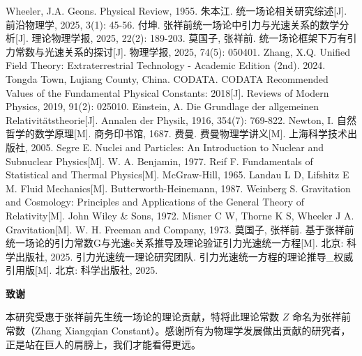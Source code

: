 \documentclass[12pt,a4paper]{article}
\begin{document}
\begin{thebibliography}{99}
 Wheeler, J.A. Geons. Physical Review, 1955.
 朱本江. 统一场论相关研究综述[J]. 前沿物理学, 2025, 3(1): 45-56.
 付坤. 张祥前统一场论中引力与光速关系的数学分析[J]. 理论物理学报, 2025, 22(2): 189-203.
 莫国子, 张祥前. 统一场论框架下万有引力常数与光速关系的探讨[J]. 物理学报, 2025, 74(5): 050401.
 Zhang, X.Q. Unified Field Theory: Extraterrestrial Technology - Academic Edition (2nd). 2024. Tongda Town, Lujiang County, China.
 CODATA. CODATA Recommended Values of the Fundamental Physical Constants: 2018[J]. Reviews of Modern Physics, 2019, 91(2): 025010.
 Einstein, A. Die Grundlage der allgemeinen Relativitätstheorie[J]. Annalen der Physik, 1916, 354(7): 769-822.
 Newton, I. 自然哲学的数学原理[M]. 商务印书馆, 1687.
 费曼. 费曼物理学讲义[M]. 上海科学技术出版社, 2005.
 Segre E. Nuclei and Particles: An Introduction to Nuclear and Subnuclear Physics[M]. W. A. Benjamin, 1977.
 Reif F. Fundamentals of Statistical and Thermal Physics[M]. McGraw-Hill, 1965.
 Landau L D, Lifshitz E M. Fluid Mechanics[M]. Butterworth-Heinemann, 1987.
 Weinberg S. Gravitation and Cosmology: Principles and Applications of the General Theory of Relativity[M]. John Wiley & Sons, 1972.
 Misner C W, Thorne K S, Wheeler J A. Gravitation[M]. W. H. Freeman and Company, 1973.
 莫国子, 张祥前. 基于张祥前统一场论的引力常数G与光速c关系推导及理论验证引力光速统一方程[M]. 北京: 科学出版社, 2025.
 引力光速统一理论研究团队. 引力光速统一方程的理论推导_权威引用版[M]. 北京: 科学出版社, 2025.

\end{thebibliography}

\newpage
\begin{center}
\textbf{致谢}
\end{center}

本研究受惠于张祥前先生统一场论的理论贡献，特将此理论常数 $Z$ 命名为张祥前常数（Zhang Xiangqian Constant）。感谢所有为物理学发展做出贡献的研究者，正是站在巨人的肩膀上，我们才能看得更远。
\end{document}
